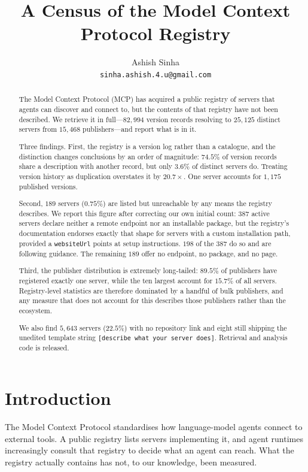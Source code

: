 \documentclass[11pt]{article}
\title{A Census of the Model Context Protocol Registry}
\author{Ashish Sinha\\
\texttt{sinha.ashish.4.u@gmail.com}}
\date{}
\begin{document}
\maketitle

\begin{abstract}
The Model Context Protocol (MCP) has acquired a public registry of servers that
agents can discover and connect to, but the contents of that registry have not
been described. We retrieve it in full---$82{,}994$ version records resolving
to $25{,}125$ distinct servers from $15{,}468$ publishers---and report what is
in it.

Three findings. First, the registry is a version log rather than a catalogue,
and the distinction changes conclusions by an order of magnitude: $74.5\%$ of
version records share a description with another record, but only $3.6\%$ of
distinct servers do. Treating version history as duplication overstates it by
$20.7\times$. One server accounts for $1{,}175$ published versions.

Second, $189$ servers ($0.75\%$) are listed but unreachable by any means the
registry describes. We report this figure after correcting our own initial
count: $387$ active servers declare neither a remote endpoint nor an
installable package, but the registry's documentation endorses exactly that
shape for servers with a custom installation path, provided a
\texttt{websiteUrl} points at setup instructions. $198$ of the $387$ do so and
are following guidance. The remaining $189$ offer no endpoint, no package, and
no page.

Third, the publisher distribution is extremely long-tailed: $89.5\%$ of
publishers have registered exactly one server, while the ten largest account
for $15.7\%$ of all servers. Registry-level statistics are therefore
dominated by a handful of bulk publishers, and any measure that does not
account for this describes those publishers rather than the ecosystem.

We also find $5{,}643$ servers ($22.5\%$) with no repository link and eight
still shipping the unedited template string \texttt{[describe what your server
does]}. Retrieval and analysis code is released.
\end{abstract}

\section{Introduction}

The Model Context Protocol standardises how language-model agents connect to
external tools. A public registry lists servers implementing it, and agent
runtimes increasingly consult that registry to decide what an agent can reach.
What the registry actually contains has not, to our knowledge, been measured.
\end{document}
